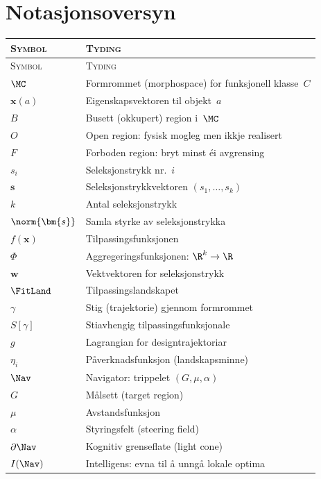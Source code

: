 \chapter{Notasjonsoversyn}
\label{app:notasjon}

{\small
\begin{longtable}{@{}p{28mm}p{62mm}@{}}
\toprule
\textsc{Symbol} & \textsc{Tyding} \\
\midrule
\endfirsthead
\toprule
\textsc{Symbol} & \textsc{Tyding} \\
\midrule
\endhead
\bottomrule
\endfoot

$\MC$ & Formrommet (morphospace) for funksjonell klasse~$C$ \\
$\bm{x}(a)$ & Eigenskapsvektoren til objekt~$a$ \\
$B$ & Busett (okkupert) region i~$\MC$ \\
$O$ & Open region: fysisk mogleg men ikkje realisert \\
$F$ & Forboden region: bryt minst éi avgrensing \\
\addlinespace
$s_i$ & Seleksjonstrykk nr.~$i$ \\
$\bm{s}$ & Seleksjonstrykkvektoren $(s_1, \ldots, s_k)$ \\
$k$ & Antal seleksjonstrykk \\
$\norm{\bm{s}}$ & Samla styrke av seleksjonstrykka \\
\addlinespace
$f(\bm{x})$ & Tilpassingsfunksjonen \\
$\Phi$ & Aggregeringsfunksjonen: $\R^k \to \R$ \\
$\bm{w}$ & Vektvektoren for seleksjonstrykk \\
$\FitLand$ & Tilpassingslandskapet \\
\addlinespace
$\gamma$ & Stig (trajektorie) gjennom formrommet \\
$S[\gamma]$ & Stiavhengig tilpassingsfunksjonale \\
$g$ & Lagrangian for designtrajektoriar \\
$\eta_i$ & Påverknadsfunksjon (landskapsminne) \\
\addlinespace
$\Nav$ & Navigator: trippelet $(G, \mu, \alpha)$ \\
$G$ & Målsett (target region) \\
$\mu$ & Avstandsfunksjon \\
$\alpha$ & Styringsfelt (steering field) \\
$\partial \Nav$ & Kognitiv grenseflate (light cone) \\
$I(\Nav)$ & Intelligens: evna til å unngå lokale optima \\

\end{longtable}}
